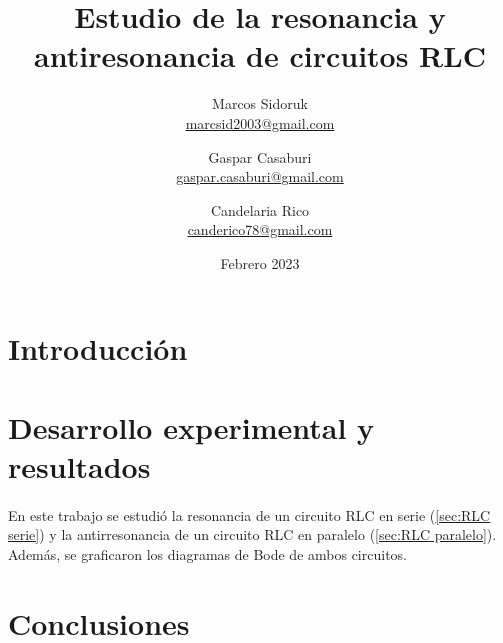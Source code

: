 \documentclass{article}
\title{Estudio de la resonancia y antiresonancia de circuitos RLC}
\author{Marcos Sidoruk \\ \href{mailto:marcsid2003@gmail.com}{marcsid2003@gmail.com} \and Gaspar Casaburi \\ \href{mailto:gaspar.casaburi@gmail.com}{gaspar.casaburi@gmail.com} \and Candelaria Rico \\ \href{mailto:canderico78@gmail.com}{canderico78@gmail.com}}
\date{Febrero 2023}
\begin{document}
\maketitle

\begin{abstract}
    
\end{abstract}

\section{Introducción}



\section{Desarrollo experimental y resultados}
\paragraph{}
En este trabajo se estudió la resonancia de un circuito RLC en serie (\ref{sec:RLC serie}) y la antirresonancia de un circuito RLC en paralelo (\ref{sec:RLC paralelo}). Además, se graficaron los diagramas de Bode de ambos circuitos.




\section{Conclusiones}









\printbibliography
\end{document}
